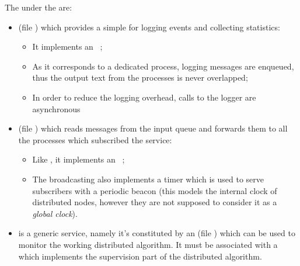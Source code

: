 The  under the  
are:
\begin{itemize}

\item   {} (file )
        which provides a simple  for logging events and
        collecting statistics:
    \begin{itemize}

    \item   It implements an \OTP\ ;

    \item   As it corresponds to a dedicated process, logging messages are
            enqueued, thus the output text from the processes is never
            overlapped;

    \item   In order to reduce the logging overhead, calls to the logger
            are asynchronous

    \end{itemize}

\item   {} (file ) which
        reads messages from the input queue and forwards them to all the
        processes which subscribed the service:
    \begin{itemize}

    \item   Like , it implements an \OTP\
            ;

    \item   The broadcasting also implements a timer which is used to
            serve subscribers with a periodic beacon (this models the
            internal clock of distributed nodes, however they are not
            supposed to consider it as a \emph{global clock}).

    \end{itemize}

\item   {} is a generic service, namely it's
        constituted by an 
        (file )
        which can be used to monitor the working distributed algorithm.
        It must be associated with a \Keyword{specific component} which
        implements the supervision part of the distributed algorithm.

\end{itemize}


